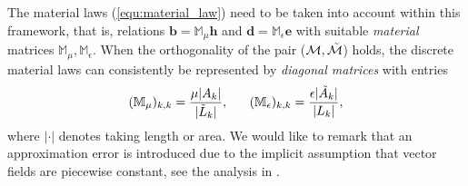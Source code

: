 \documentclass{article}
\begin{document}
The material laws (\ref{equ:material_law}) need to be taken into account within this
framework, that is, relations $\mathbf{b} = \mathbb{M}_\mu \mathbf{h}$ and $\mathbf{d} =
\mathbb{M}_\epsilon \mathbf{e}$ with suitable \emph{material} matrices $\mathbb{M}_\mu,
\mathbb{M}_\epsilon$. When the orthogonality of the pair ($\mathcal{M},
\Tilde{\mathcal{M}}$) holds, the discrete material laws can consistently be represented by
\emph{diagonal matrices} with entries
\begin{equation*}
    (\mathbb{M}_\mu)_{k,k} = \frac{\mu|A_k|}{|\Tilde{L}_k|}, \ \ \ \ \ (\mathbb{M}_\epsilon)_{k,k} = \frac{\epsilon |\Tilde{A}_k|}{|L_k|},
\end{equation*}
where $|\cdot|$ denotes taking length or area. We would like to remark that an
approximation error is introduced due to the implicit assumption that vector fields are
piecewise constant, see the analysis in \cite[][Sec. 3.2]{Marrone_2001}.
\end{document}
